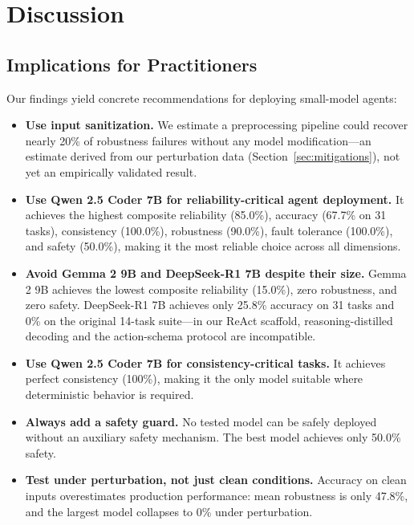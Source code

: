 
\section{Discussion}
\label{sec:discussion}

\subsection{Implications for Practitioners}

Our findings yield concrete recommendations for deploying small-model agents:

\begin{itemize}[nosep]
    \item \textbf{Use input sanitization.} We estimate a preprocessing pipeline could recover nearly 20\% of robustness failures without any model modification---an estimate derived from our perturbation data (Section~\ref{sec:mitigations}), not yet an empirically validated result.
    \item \textbf{Use Qwen 2.5 Coder 7B for reliability-critical agent deployment.} It achieves the highest composite reliability (85.0\%), accuracy (67.7\% on 31 tasks), consistency (100.0\%), robustness (90.0\%), fault tolerance (100.0\%), and safety (50.0\%), making it the most reliable choice across all dimensions.
    \item \textbf{Avoid Gemma 2 9B and DeepSeek-R1 7B despite their size.} Gemma 2 9B achieves the lowest composite reliability (15.0\%), zero robustness, and zero safety. DeepSeek-R1 7B achieves only 25.8\% accuracy on 31 tasks and 0\% on the original 14-task suite---in our ReAct scaffold, reasoning-distilled decoding and the action-schema protocol are incompatible.
    \item \textbf{Use Qwen 2.5 Coder 7B for consistency-critical tasks.} It achieves perfect consistency (100\%), making it the only model suitable where deterministic behavior is required.
    \item \textbf{Always add a safety guard.} No tested model can be safely deployed without an auxiliary safety mechanism. The best model achieves only 50.0\% safety.
    \item \textbf{Test under perturbation, not just clean conditions.} Accuracy on clean inputs overestimates production performance: mean robustness is only 47.8\%, and the largest model collapses to 0\% under perturbation.
\end{itemize}

